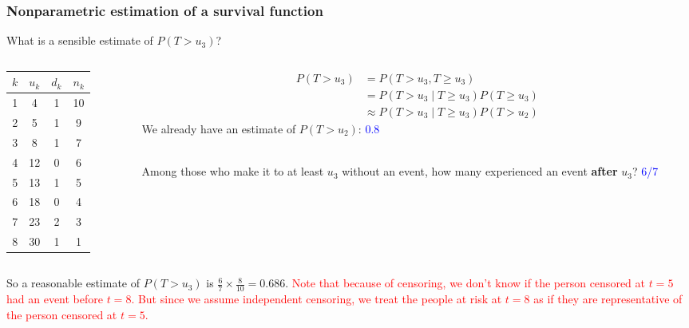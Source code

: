 \documentclass[10pt,t]{beamer}
\begin{document}
\begin{frame}
	\frametitle{Nonparametric estimation of a survival function}
	\vspace{-0.5cm}
	What is a sensible estimate of $P(T > u_3)$?
	
	\begin{columns}
		\begin{column}{0.3\textwidth}
			\begin{center}

\begin{tabular}{|c|c|c|c|}
	\hline
	$k$ & $u_k$ & $d_k$ & $n_k$ \\
	\hline
	1 & 4 & 1 & 10 \\
	2& 5 & 1 & 9 \\
	3& 8 & 1 & 7 \\
	4&12 & 0 & 6 \\
	5&13 & 1 & 5 \\
	6&18 & 0 & 4 \\
	7&23 & 2 & 3 \\
	8&30 & 1 & 1 \\
	\hline
\end{tabular}

			\end{center}
		\end{column}
		\begin{column}{0.7\textwidth}  %
			\begin{align*}
				P(T > u_3) &= P(T > u_3, T\geq u_3) \\
				&= P(T > u_3 \mid T \geq u_3)P(T \geq u_3)\\
				&\approx P(T > u_3 \mid T \geq u_3)P(T > u_2)
			\end{align*}
			We already have an estimate of $P(T > u_2)$: \textcolor{blue}{0.8}  
			\\ ~\ 
			
			Among those who make it to at least $u_3$ without an event, how many experienced an event \textbf{after} $u_3$?   \textcolor{blue}{6/7}
		\end{column}
	\end{columns}
	\vspace{0.5cm}
	So a reasonable estimate of $P(T > u_3)$ is $\frac{6}{7} \times \frac{8}{10} = 0.686$. \textcolor{red}{Note that because of censoring, we don't know if the person censored at $t = 5$ had an event before $t = 8$. But since we assume independent censoring, we treat the people at risk at $t = 8$ as if they are representative of the person censored at $t = 5$.}   
\end{frame}
\end{document}
